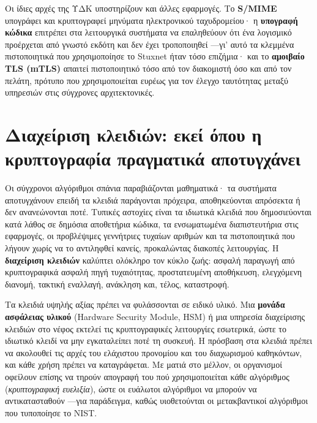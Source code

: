 Οι ίδιες αρχές της ΥΔΚ υποστηρίζουν και άλλες εφαρμογές. Το \textbf{S/MIME} υπογράφει και κρυπτογραφεί μηνύματα ηλεκτρονικού ταχυδρομείου· η \textbf{υπογραφή κώδικα} επιτρέπει στα λειτουργικά συστήματα να επαληθεύουν ότι ένα λογισμικό προέρχεται από γνωστό εκδότη και δεν έχει τροποποιηθεί —γι' αυτό τα κλεμμένα πιστοποιητικά που χρησιμοποίησε το Stuxnet ήταν τόσο επιζήμια· και το \textbf{αμοιβαίο TLS (mTLS)} απαιτεί πιστοποιητικό τόσο από τον διακομιστή όσο και από τον πελάτη, πρότυπο που χρησιμοποιείται ευρέως για τον έλεγχο ταυτότητας μεταξύ υπηρεσιών στις σύγχρονες αρχιτεκτονικές.

\section{Διαχείριση κλειδιών: εκεί όπου η κρυπτογραφία πραγματικά αποτυγχάνει}\label{sec:7.6}
Οι σύγχρονοι αλγόριθμοι σπάνια παραβιάζονται μαθηματικά· τα συστήματα αποτυγχάνουν επειδή τα κλειδιά παράγονται πρόχειρα, αποθηκεύονται απρόσεκτα ή δεν ανανεώνονται ποτέ. Τυπικές αστοχίες είναι τα ιδιωτικά κλειδιά που δημοσιεύονται κατά λάθος σε δημόσια αποθετήρια κώδικα, τα ενσωματωμένα διαπιστευτήρια στις εφαρμογές, οι προβλέψιμες γεννήτριες τυχαίων αριθμών και τα πιστοποιητικά που λήγουν χωρίς να το αντιληφθεί κανείς, προκαλώντας διακοπές λειτουργίας. Η \textbf{διαχείριση κλειδιών} καλύπτει ολόκληρο τον κύκλο ζωής: ασφαλή παραγωγή από κρυπτογραφικά ασφαλή πηγή τυχαιότητας, προστατευμένη αποθήκευση, ελεγχόμενη διανομή, τακτική εναλλαγή, ανάκληση και, τέλος, καταστροφή.

Τα κλειδιά υψηλής αξίας πρέπει να φυλάσσονται σε ειδικό υλικό. Μια \textbf{μονάδα ασφάλειας υλικού} (Hardware Security Module, HSM) ή μια υπηρεσία διαχείρισης κλειδιών στο νέφος εκτελεί τις κρυπτογραφικές λειτουργίες εσωτερικά, ώστε το ιδιωτικό κλειδί να μην εγκαταλείπει ποτέ τη συσκευή. Η πρόσβαση στα κλειδιά πρέπει να ακολουθεί τις αρχές του ελάχιστου προνομίου και του διαχωρισμού καθηκόντων, και κάθε χρήση πρέπει να καταγράφεται. Με ματιά στο μέλλον, οι οργανισμοί οφείλουν επίσης να τηρούν απογραφή του πού χρησιμοποιείται κάθε αλγόριθμος (\emph{κρυπτογραφική ευελιξία}), ώστε οι ευάλωτοι αλγόριθμοι να μπορούν να αντικατασταθούν —για παράδειγμα, καθώς υιοθετούνται οι μετακβαντικοί αλγόριθμοι που τυποποίησε το NIST.

